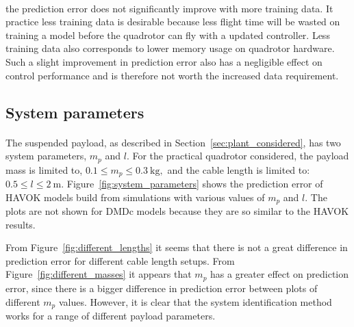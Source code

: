         \paragraph{}
        the prediction error does not significantly improve with more training data.
        It practice less training data is desirable because less flight time will be wasted on training a model before the quadrotor can fly with a updated controller.
        Less training data also corresponds to lower memory usage on quadrotor hardware.
        Such a slight improvement in prediction error also has a negligible effect on control performance and is therefore not worth the increased data requirement.


    \subsection{System parameters}
            
        \paragraph{}
        The suspended payload, as described in Section~\ref{sec:plant_considered},
        has two system parameters, $m_p$ and $l$.
        For the practical quadrotor considered, the payload mass is limited to,
        $
            0.1 \leq m_p \leq \SI{0.3}{\kilo\gram} ,
        $
        and the cable length is limited to:
        $
            0.5 \leq l \leq \SI{2}{\metre} .
        $
        Figure~\ref{fig:system_parameters} shows the prediction error of HAVOK models 
        build from simulations with various values of $m_p$ and $l$.
        The plots are not shown for DMDc models because they are so similar to the HAVOK results.

        

        From Figure~\ref{fig:different_lengths} it seems that there is not a great difference in prediction error 
        for different cable length setups.
        From Figure~\ref{fig:different_masses} it appears that $m_p$ has a greater effect on prediction error,
        since there is a bigger difference in prediction error between plots of different $m_p$ values.
        However, it is clear that the system identification method works for a range of different payload parameters.

